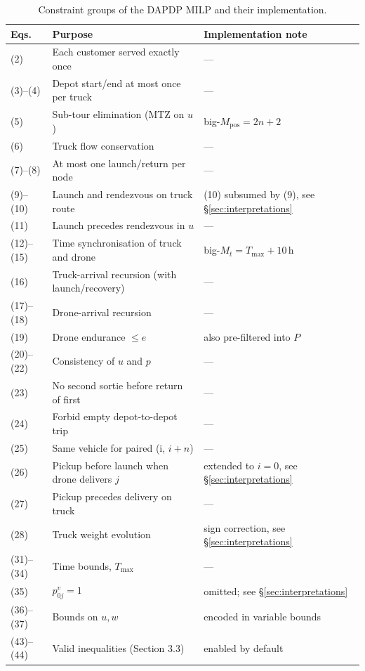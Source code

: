 \documentclass[11pt,a4paper]{article}
\newcommand{\dapdp}{\textsc{DAPDP}}
\begin{document}
\begin{table}[t]
\centering
\caption{Constraint groups of the \dapdp{} MILP and their implementation.}
\label{tab:constraints}
\small
\begin{tabular}{@{}lll@{}}
\toprule
Eqs.        & Purpose                                          & Implementation note \\
\midrule
(2)         & Each customer served exactly once                & --- \\
(3)--(4)    & Depot start/end at most once per truck           & --- \\
(5)         & Sub-tour elimination (MTZ on $u$)                & big-$M_{\text{pos}} = 2n+2$ \\
(6)         & Truck flow conservation                          & --- \\
(7)--(8)    & At most one launch/return per node               & --- \\
(9)--(10)   & Launch and rendezvous on truck route             & (10) subsumed by (9), see \S\ref{sec:interpretations} \\
(11)        & Launch precedes rendezvous in $u$                & --- \\
(12)--(15)  & Time synchronisation of truck and drone          & big-$M_t = T_{\max}+10$\,h \\
(16)        & Truck-arrival recursion (with launch/recovery)   & --- \\
(17)--(18)  & Drone-arrival recursion                          & --- \\
(19)        & Drone endurance $\le e$                          & also pre-filtered into $P$ \\
(20)--(22)  & Consistency of $u$ and $p$                       & --- \\
(23)        & No second sortie before return of first          & --- \\
(24)        & Forbid empty depot-to-depot trip                 & --- \\
(25)        & Same vehicle for paired (i, $i+n$)               & --- \\
(26)        & Pickup before launch when drone delivers $j$     & extended to $i{=}0$, see \S\ref{sec:interpretations} \\
(27)        & Pickup precedes delivery on truck                & --- \\
(28)        & Truck weight evolution                           & sign correction, see \S\ref{sec:interpretations} \\
(31)--(34)  & Time bounds, $T_{\max}$                          & --- \\
(35)        & $p^{v}_{0j}=1$                                   & omitted; see \S\ref{sec:interpretations} \\
(36)--(37)  & Bounds on $u, w$                                 & encoded in variable bounds \\
(43)--(44)  & Valid inequalities (Section 3.3)                 & enabled by default \\
\bottomrule
\end{tabular}
\end{table}
\end{document}
